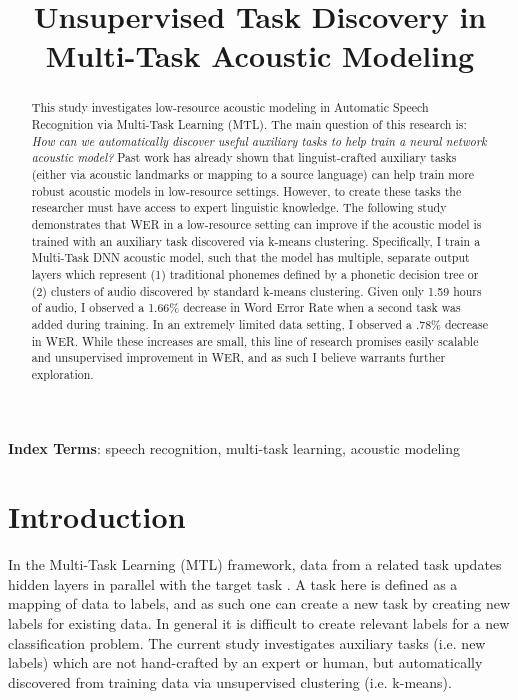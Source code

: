 \documentclass[a4paper]{article}
\title{Unsupervised Task Discovery in Multi-Task Acoustic Modeling}
\begin{document}
\maketitle
% 
\begin{abstract}

  This study investigates low-resource acoustic modeling in Automatic Speech Recognition via Multi-Task Learning (MTL). The main question of this research is: \textit{How can we automatically discover useful auxiliary tasks to help train a neural network acoustic model?} Past work has already shown that linguist-crafted auxiliary tasks (either via acoustic landmarks or mapping to a source language) can help train more robust acoustic models in low-resource settings. However, to create these tasks the researcher must have access to expert linguistic knowledge. The following study demonstrates that WER in a low-resource setting can improve if the acoustic model is trained with an auxiliary task discovered via k-means clustering. Specifically, I train a Multi-Task DNN acoustic model, such that the model has multiple, separate output layers which represent (1) traditional phonemes defined by a phonetic decision tree or (2) clusters of audio discovered by standard k-means clustering. Given only 1.59 hours of audio, I observed a 1.66\% decrease in Word Error Rate when a second task was added during training. In an extremely limited data setting, I observed a .78\% decrease in WER. While these increases are small, this line of research promises easily scalable and unsupervised improvement in WER, and as such I believe warrants further exploration.

  
\end{abstract}

\noindent\textbf{Index Terms}: speech recognition, multi-task learning, acoustic modeling





\section{Introduction}

In the Multi-Task Learning (MTL) framework, data from a related task updates hidden layers in parallel with the target task \cite{caruana1997}. A task here is defined as a mapping of data to labels, and as such one can create a new task by creating new labels for existing data. In general it is difficult to create relevant labels for a new classification problem. The current study investigates auxiliary tasks (i.e. new labels) which are not hand-crafted by an expert or human, but automatically discovered from training data via unsupervised clustering (i.e. k-means).
\end{document}
